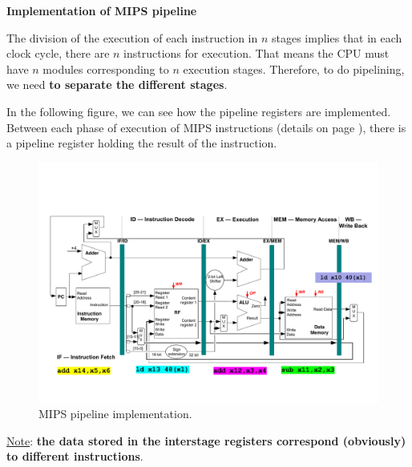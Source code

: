 \newpage

\begin{center}
    \large
    \textcolor{Red3}{\textbf{Implementation of MIPS pipeline}}
\end{center}
The division of the execution of each instruction in $n$ stages implies that in each clock cycle, there are $n$ instructions for execution. That means the CPU must have $n$ modules corresponding to $n$ execution stages. Therefore, to do pipelining, we need  \textbf{to separate the different stages}.

\highspace
In the following figure, we can see how the pipeline registers are implemented. Between each phase of execution of MIPS instructions (details on page \pageref{Phases of execution of MIPS Instructions}), there is a pipeline register holding the result of the instruction.
\begin{figure}[!htp]
    \centering
    \includegraphics[width=\textwidth]{img/pipeline-registers-1.pdf}
    \caption{MIPS pipeline implementation.\cite{pipelining-slides}}
\end{figure}

\noindent
\underline{Note}: \textbf{the data stored in the interstage registers correspond (obviously) to different instructions}.

\newpage


